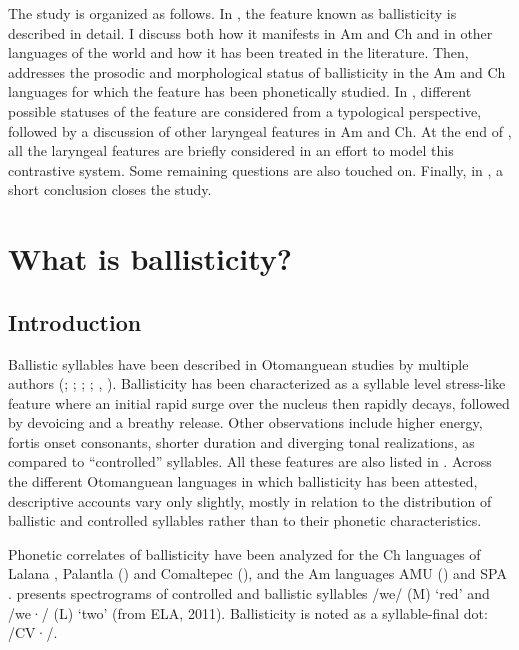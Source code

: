 \documentclass[output=paper]{langscibook}
\begin{document}
The study is organized as follows. In , the feature known as ballisticity is described in detail. I discuss both how it manifests in Am and Ch and in other languages of the world and how it has been treated in the literature. Then,  addresses the prosodic and morphological status of ballisticity in the Am and Ch languages for which the feature has been phonetically studied. In , different possible statuses of the feature are considered from a typological perspective, followed by a discussion of other laryngeal features in Am and Ch. At the end of , all the laryngeal features are briefly considered in an effort to model this contrastive system. Some remaining questions are also touched on. Finally, in , a short conclusion closes the study.

\section{What is ballisticity?}\label{sec:dobui:2}
\label{bkm:Ref102631913}
\subsection{Introduction}
Ballistic syllables have been described in Otomanguean studies by multiple authors (\citealt{Skinner1962}; \citealt{Merrifield1963,Merrifield1968}; \citealt{Bauernschmidt1965}; \citealt{Westley1971}; \citealt{Foris1973}, \citealt{Mugele1982}). Ballisticity has been characterized as a syllable level stress-like feature where an initial rapid surge over the nucleus then rapidly decays, followed by devoicing and a breathy release. Other observations include higher energy, fortis onset consonants, shorter duration and diverging tonal realizations, as compared to ``controlled'' syllables. All these features are also listed in \citet{DiCanioBennett2020}. Across the different Otomanguean languages in which ballisticity has been attested, descriptive accounts vary only slightly, mostly in relation to the distribution of ballistic and controlled syllables rather than to their phonetic characteristics.

Phonetic correlates of ballisticity have been analyzed for the Ch languages of Lalana \citep{Mugele1982}, Palantla (\citealt{MerrifieldEdmondson1999}) and Comaltepec (\citealt{Silverman1994,Silverman1997a}), and the Am languages AMU (\citealt{Zendejas2000}) and SPA \citep{Kim2011}.  presents spectrograms of controlled and ballistic syllables /we/ (M) ‘red’ and /we·/ (L) ‘two’ (from ELA, 2011). Ballisticity is noted as a syllable-final dot: /CV·/.
\end{document}
